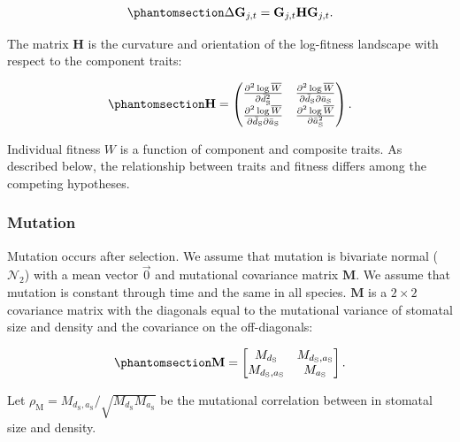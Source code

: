 \documentclass[
  letterpaper,
  DIV=11,
  numbers=noendperiod]{scrartcl}
\begin{document}
\begin{equation}\phantomsection\label{eq-dG}{\Delta \mathbf{G}_{j,t} = \mathbf{G}_{j,t} \mathbf{H} \mathbf{G}_{j,t}.}\end{equation}

The matrix \(\mathbf{H}\) is the curvature and orientation of the
log-fitness landscape with respect to the component traits:

\begin{equation}\phantomsection\label{eq-H}{\mathbf{H} = \begin{pmatrix} \frac{\partial^2 \log \overline{W}}{\partial \bar{d}^2_\mathrm{S}} & \frac{\partial^2 \log \overline{W}}{\partial \bar{d}_\mathrm{S} \partial \bar{a}_{\mathrm{S}}} \\ \frac{\partial^2 \log \overline{W}}{\partial \bar{d}_\mathrm{S} \partial \bar{a}_\mathrm{S}} & \frac{\partial^2 \log \overline{W}}{\partial \bar{a}^2_\mathrm{S}}  \end{pmatrix}.}\end{equation}

Individual fitness \(W\) is a function of component and composite
traits. As described below, the relationship between traits and fitness
differs among the competing hypotheses.

\subsubsection{Mutation}\label{mutation}

Mutation occurs after selection. We assume that mutation is bivariate
normal (\(\mathcal{N}_2\)) with a mean vector \(\vec{0}\) and mutational
covariance matrix \(\mathbf{M}\). We assume that mutation is constant
through time and the same in all species. \(\mathbf{M}\) is a
\(2 \times 2\) covariance matrix with the diagonals equal to the
mutational variance of stomatal size and density and the covariance on
the off-diagonals:

\begin{equation}\phantomsection\label{eq-M}{\mathbf{M} = \begin{bmatrix} M_{d_\mathrm{S}} & M_{d_\mathrm{S},a_\mathrm{S}} \\ M_{d_\mathrm{S},a_\mathrm{S}} & M_{a_\mathrm{S}} \end{bmatrix}.}\end{equation}

Let
\(\rho_\mathrm{M} = M_{d_\mathrm{S},a_\mathrm{S}} / \sqrt{M_{d_\mathrm{S}} M_{a_\mathrm{S}}}\)
be the mutational correlation between in stomatal size and density.
\end{document}
